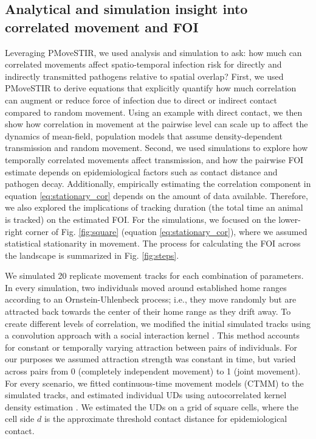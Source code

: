 ﻿\documentclass[11pt]{article}
\begin{document}
\subsection*{Analytical and simulation insight into correlated movement and FOI}

Leveraging PMoveSTIR, we used analysis and simulation to ask: how much can correlated movements affect spatio-temporal infection risk for directly and indirectly transmitted pathogens relative to spatial overlap? 
First, we used PMoveSTIR to derive equations that explicitly quantify how much correlation can augment or reduce force of infection due to direct or indirect contact compared to random movement. Using an example with direct contact, we then show how correlation in movement at the pairwise level can scale up to affect the dynamics of mean-field, population models that assume density-dependent transmission and random movement.
Second, we used simulations to explore how temporally correlated movements affect  transmission, and how the pairwise FOI estimate depends on epidemiological factors such as contact distance and pathogen decay. Additionally, empirically estimating the correlation component in equation \ref{eq:stationary_cor} depends on the amount of data available. Therefore, we also explored the implications of tracking duration (the total time an animal is tracked) on the estimated FOI. For the simulations, we focused on the lower-right corner of Fig. \ref{fig:square} (equation \ref{eq:stationary_cor}), where we assumed statistical stationarity in movement. The process for calculating the FOI across the landscape is summarized in Fig. \ref{fig:steps}.

We simulated 20 replicate movement tracks for each combination of parameters. In every simulation, two individuals moved around established home ranges according to an Ornstein-Uhlenbeck process; i.e., they move randomly but are attracted back towards the center of their home range as they drift away. To create different levels of correlation, we modified the initial simulated tracks using a convolution approach with a social interaction kernel \citep{Scharf2018}. This method accounts for constant or temporally varying attraction between pairs of individuals. For our purposes we assumed attraction strength was constant in time, but varied across pairs from 0 (completely independent movement) to 1 (joint movement). %
For every scenario, we fitted continuous-time movement models (CTMM) to the simulated tracks, and estimated individual UDs using autocorrelated kernel density estimation \citep[AKDE, ][]{Calabrese2016}. We estimated the UDs on a grid of square cells, where the cell side $d$ is the approximate threshold contact distance for epidemiological contact. 
\end{document}
